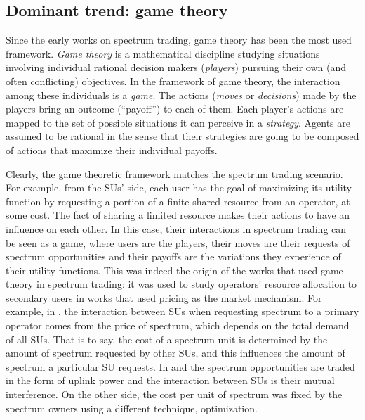 \subsection{Dominant trend: game theory}
\label{sec:GameTheory}

Since the early works on spectrum trading, game theory \cite{ref:Myerson1997} has been the most used framework. 
\textit{Game theory} is a mathematical discipline studying situations involving individual rational decision makers (\textit{players}) pursuing their own (and often conflicting) objectives. 
In the framework of game theory, the interaction among these individuals is a \textit{game}. The actions (\textit{moves} or \textit{decisions}) made by the players bring an outcome (``payoff'') to each of them. 
Each player's actions are mapped to the set of possible situations it can perceive in a \textit{strategy}. Agents are assumed to be rational in the sense that their strategies are going to be composed of actions that maximize their individual payoffs.

Clearly, the game theoretic framework matches the spectrum trading scenario.
For example, from the SUs' side, each user has the goal of maximizing its utility function by requesting a portion of a finite shared resource from an operator, at some cost. 
The fact of sharing a limited resource makes their actions to have an influence on each other. 
In this case, their interactions in spectrum trading can be seen as a game, where users are the players, their moves are their requests of spectrum opportunities and their payoffs are the variations they experience of their utility functions. 
This was indeed the origin of the works that used game theory in spectrum trading: it was used to study operators' resource allocation to secondary users in works that used pricing as the market mechanism.
For example, in \cite{ref:Niyato2007_Game}, the interaction between SUs when requesting spectrum to a primary operator comes from the price of spectrum, which depends on the total demand of all SUs. 
That is to say, the cost of a spectrum unit is determined by the amount of spectrum requested by other SUs, and this influences the amount of spectrum a particular SU requests. 
In \cite{ref:Yu2010} and \cite{ref:Wang2008} the spectrum opportunities are traded in the form of uplink power and the interaction between SUs is their mutual interference. 
On the other side, the cost per unit of spectrum was fixed by the spectrum owners using a different technique, optimization.

